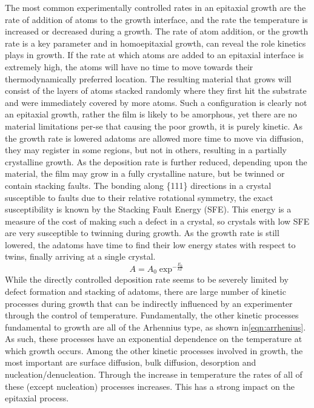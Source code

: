 The most common experimentally controlled rates in an epitaxial growth are the rate of addition of atoms to the growth interface, and the rate the temperature is increased or decreased during a growth. The rate of atom addition, or the growth rate is a key parameter and in homoepitaxial growth, can reveal the role kinetics plays in growth. If the rate at which atoms are added to an epitaxial interface is extremely high, the atoms will have no time to move towards their thermodynamically preferred location. The resulting material that grows will consist of the layers of atoms stacked randomly where they first hit the substrate and were immediately covered by more atoms. Such a configuration is clearly not an epitaxial growth, rather the film is likely to be amorphous, yet there are no material limitations per-se that causing the poor growth, it is purely kinetic. As the growth rate is lowered adatoms are allowed more time to move via diffusion, they may register in some regions, but not in others, resulting in a partially crystalline growth. As the deposition rate is further reduced, depending upon the material, the film may grow in a fully crystalline nature, but be twinned or contain stacking faults. The bonding along \{111\} directions in a crystal susceptible to faults due to their relative rotational symmetry, the exact susceptibility is known by the Stacking Fault Energy (SFE)\cite{Duffar2010}. This energy is a measure of the cost of making such a defect in a crystal, so crystals with low SFE are very susceptible to twinning during growth. As the growth rate is still lowered, the adatoms have time to find their low energy states with respect to twins, finally arriving at a single crystal.
\begin{equation}
A = A_0 \exp^{-\frac{E_0}{kT}} \label{eqn:arrhenius}
\end{equation}
While the directly controlled deposition rate seems to be severely limited by defect formation and stacking of adatoms, there are large number of kinetic processes during growth that can be indirectly influenced by an experimenter through the control of temperature. Fundamentally, the other kinetic processes fundamental to growth are all of the Arhennius type, as shown in\cref{eqn:arrhenius}. As such, these processes have an exponential dependence on the temperature at which growth occurs. Among the other kinetic processes involved in growth, the most important are surface diffusion, bulk diffusion, desorption and nucleation/denucleation. Through the increase in temperature the rates of all of these (except nucleation) processes increases. This has a strong impact on the epitaxial process. 

